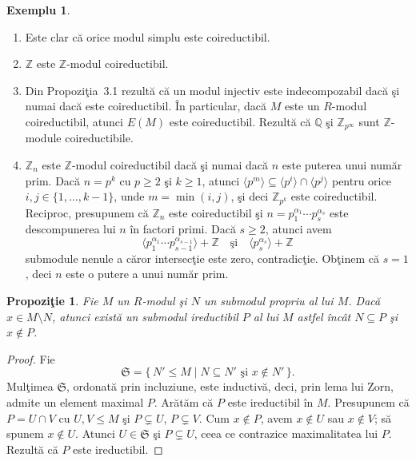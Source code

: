 \documentclass[12pt,a4paper]{book}
\theoremstyle{plain}
\newtheorem{proposition}[theorem]{Propoziţie}
\theoremstyle{definition}
\newtheorem*{example*}{Exemplu}         %
\theoremstyle{remark}
\begin{document}
\begin{example*}
\leavevmode
\begin{enumerate}
  \item Este clar că orice modul simplu este coireductibil.
  \item \(\mathbb{Z}\) este \(\mathbb{Z}\)-modul coireductibil.
  \item Din Propoziţia~3.1 rezultă că un modul injectiv este indecompozabil
        dacă şi numai dacă este coireductibil.
        În particular, dacă \(M\) este un \(R\)-modul coireductibil, atunci
        \(E(M)\) este coireductibil. Rezultă că \(\mathbb{Q}\) şi
        \(\mathbb{Z}_{p^\infty}\) sunt \(\mathbb{Z}\)-module coireductibile.
  \item \(\mathbb{Z}_n\) este \(\mathbb{Z}\)-modul coireductibil dacă şi numai
        dacă \(n\) este puterea unui număr prim. Dacă \(n = p^k\) cu
        \(p \ge 2\) şi \(k \ge 1\), atunci
        \(\langle p^m \rangle \subseteq \langle p^i \rangle \cap \langle p^j \rangle\)
        pentru orice \(i,j \in \{1,\dots,k-1\}\), unde \(m = \min(i,j)\), şi deci
        \(\mathbb{Z}_{p^k}\) este coireductibil.
        Reciproc, presupunem că \(\mathbb{Z}_n\) este coireductibil şi
        \(n = p_1^{\alpha_1}\cdots p_s^{\alpha_s}\) este descompunerea lui \(n\)
        în factori primi. Dacă \(s \ge 2\), atunci avem
        \[
          \langle p_1^{\alpha_1}\cdots p_{s-1}^{\alpha_{s-1}} \rangle
          + \mathbb{Z}
          \quad\text{şi}\quad
          \langle p_s^{\alpha_s} \rangle + \mathbb{Z}
        \]
        submodule nenule a căror intersecţie este zero, contradicţie.
        Obţinem că \(s = 1\), deci \(n\) este o putere a unui număr prim.
\end{enumerate}
\end{example*}

\begin{proposition}
Fie \(M\) un \(R\)-modul şi \(N\) un submodul propriu al lui \(M\).
Dacă \(x \in M \setminus N\), atunci există un submodul ireductibil \(P\) al
lui \(M\) astfel încât \(N \subseteq P\) şi \(x \notin P\).
\end{proposition}

\begin{proof}
Fie
\[
\mathfrak{S} = \{\,N' \le M \mid N \subseteq N' \text{ şi } x \notin N'\,\}.
\]
Mulţimea \(\mathfrak{S}\), ordonată prin incluziune, este inductivă, deci,
prin lema lui Zorn, admite un element maximal \(P\).
Arătăm că \(P\) este ireductibil în \(M\).
Presupunem că \(P = U \cap V\) cu \(U,V \le M\) şi \(P \subsetneq U\),
\(P \subsetneq V\).
Cum \(x \notin P\), avem \(x \notin U\) sau \(x \notin V\); să spunem
\(x \notin U\).
Atunci \(U \in \mathfrak{S}\) şi \(P \subsetneq U\), ceea ce contrazice
maximalitatea lui \(P\).
Rezultă că \(P\) este ireductibil.
\end{proof}
\end{document}
